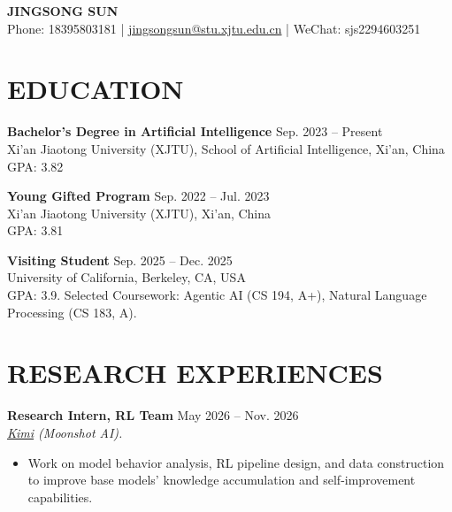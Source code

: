 \documentclass[a4paper,9pt]{extarticle}
\begin{document}
\pagestyle{empty}

\begin{center}
    \textbf{\Large JINGSONG SUN}\\[3pt]
    Phone: 18395803181 | \href{mailto:jingsongsun@stu.xjtu.edu.cn}{jingsongsun@stu.xjtu.edu.cn} | WeChat: sjs2294603251
\end{center}

\section*{EDUCATION}
    \noindent
    \textbf{Bachelor's Degree in Artificial Intelligence} \hfill Sep. 2023 -- Present \\
    Xi'an Jiaotong University (XJTU), School of Artificial Intelligence, Xi'an, China \\
    GPA: 3.82

    \medskip
    \noindent
    \textbf{Young Gifted Program} \hfill Sep. 2022 -- Jul. 2023 \\
    Xi'an Jiaotong University (XJTU), Xi'an, China \\
    GPA: 3.81

    \medskip
    \noindent
    \textbf{Visiting Student} \hfill Sep. 2025 -- Dec. 2025 \\
    University of California, Berkeley, CA, USA \\
    GPA: 3.9. Selected Coursework: Agentic AI (CS 194, A+), Natural Language Processing (CS 183, A).

\section*{RESEARCH EXPERIENCES}

    \noindent
    \textbf{Research Intern, RL Team} \hfill May 2026 -- Nov. 2026 \\
    \textit{\href{https://www.kimi.com/}{Kimi} (Moonshot AI).}
    \begin{itemize}
        \item Work on model behavior analysis, RL pipeline design, and data construction to improve base models' knowledge accumulation and self-improvement capabilities.
    \end{itemize}
\end{document}
